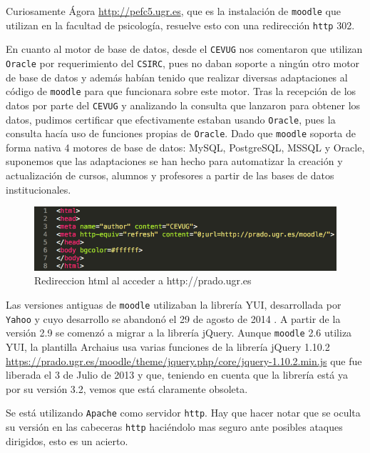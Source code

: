 \bigskip
Curiosamente Ágora \url{http://pefc5.ugr.es}, que es la instalación de \texttt{moodle} que utilizan en la facultad de psicología, resuelve esto con una redirección \texttt{http} 302.

\bigskip
En cuanto al motor de base de datos, desde el \texttt{CEVUG} nos comentaron que utilizan \texttt{Oracle} por requerimiento del \texttt{CSIRC}, pues no daban soporte a ningún otro motor de base de datos y además habían tenido que realizar diversas adaptaciones al código de \texttt{moodle} para que funcionara sobre este motor. Tras la recepción de los datos por parte del \texttt{CEVUG} y analizando la consulta que lanzaron para obtener los datos, pudimos certificar que efectivamente estaban usando \texttt{Oracle}, pues la consulta hacía uso de funciones propias de \texttt{Oracle}. Dado que \texttt{moodle} soporta de forma nativa 4 motores de base de datos: MySQL, PostgreSQL, MSSQL y Oracle, suponemos que las adaptaciones se han hecho para automatizar la creación y actualización de cursos, alumnos y profesores a partir de las bases de datos institucionales.

\begin{figure}
\centering
\includegraphics[width=1.0\textwidth]{../screenshots/redireccionhttp}
\caption{Redireccion html al acceder a http://prado.ugr.es}
\label{redireccionhttp}
\end{figure}

\bigskip
Las versiones antiguas de \texttt{moodle} utilizaban la librería YUI, desarrollada por \texttt{Yahoo} y cuyo desarrollo se abandonó el 29 de agosto de 2014 \cite{art_01}. A partir de la versión 2.9 se comenzó a migrar a la librería jQuery. Aunque \texttt{moodle} 2.6 utiliza YUI, la plantilla Archaius usa varias funciones de la librería jQuery 1.10.2 \url{https://prado.ugr.es/moodle/theme/jquery.php/core/jquery-1.10.2.min.js} que fue liberada el 3 de Julio de 2013 y que, teniendo en cuenta que la librería está ya por su versión 3.2, vemos que está claramente obsoleta.

\bigskip
Se está utilizando \texttt{Apache} como servidor \texttt{http}. Hay que hacer notar que se oculta su versión en las cabeceras \texttt{http} haciéndolo mas seguro ante posibles ataques dirigidos, esto es un acierto.

